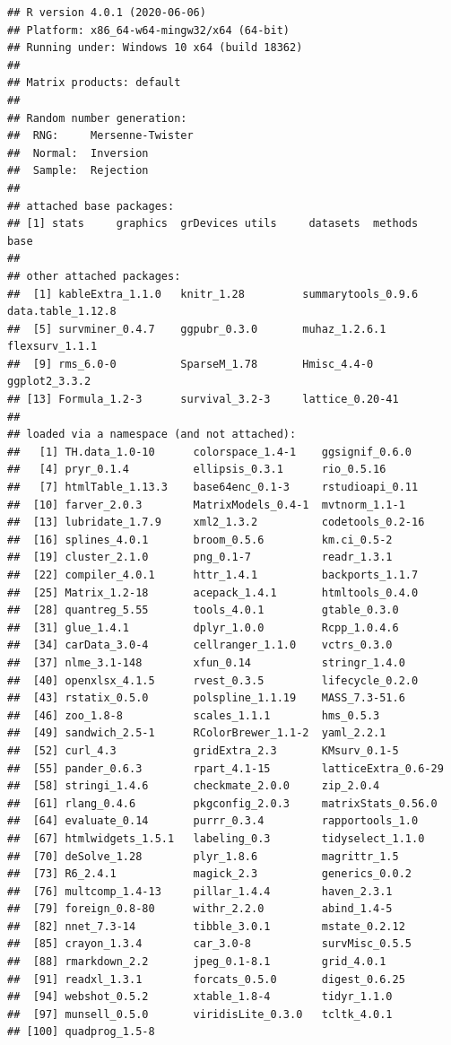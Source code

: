 \documentclass[]{article}
\begin{document}
\begin{verbatim}
## R version 4.0.1 (2020-06-06)
## Platform: x86_64-w64-mingw32/x64 (64-bit)
## Running under: Windows 10 x64 (build 18362)
## 
## Matrix products: default
## 
## Random number generation:
##  RNG:     Mersenne-Twister 
##  Normal:  Inversion 
##  Sample:  Rejection 
##  
## attached base packages:
## [1] stats     graphics  grDevices utils     datasets  methods   base     
## 
## other attached packages:
##  [1] kableExtra_1.1.0   knitr_1.28         summarytools_0.9.6 data.table_1.12.8 
##  [5] survminer_0.4.7    ggpubr_0.3.0       muhaz_1.2.6.1      flexsurv_1.1.1    
##  [9] rms_6.0-0          SparseM_1.78       Hmisc_4.4-0        ggplot2_3.3.2     
## [13] Formula_1.2-3      survival_3.2-3     lattice_0.20-41   
## 
## loaded via a namespace (and not attached):
##   [1] TH.data_1.0-10      colorspace_1.4-1    ggsignif_0.6.0     
##   [4] pryr_0.1.4          ellipsis_0.3.1      rio_0.5.16         
##   [7] htmlTable_1.13.3    base64enc_0.1-3     rstudioapi_0.11    
##  [10] farver_2.0.3        MatrixModels_0.4-1  mvtnorm_1.1-1      
##  [13] lubridate_1.7.9     xml2_1.3.2          codetools_0.2-16   
##  [16] splines_4.0.1       broom_0.5.6         km.ci_0.5-2        
##  [19] cluster_2.1.0       png_0.1-7           readr_1.3.1        
##  [22] compiler_4.0.1      httr_1.4.1          backports_1.1.7    
##  [25] Matrix_1.2-18       acepack_1.4.1       htmltools_0.4.0    
##  [28] quantreg_5.55       tools_4.0.1         gtable_0.3.0       
##  [31] glue_1.4.1          dplyr_1.0.0         Rcpp_1.0.4.6       
##  [34] carData_3.0-4       cellranger_1.1.0    vctrs_0.3.0        
##  [37] nlme_3.1-148        xfun_0.14           stringr_1.4.0      
##  [40] openxlsx_4.1.5      rvest_0.3.5         lifecycle_0.2.0    
##  [43] rstatix_0.5.0       polspline_1.1.19    MASS_7.3-51.6      
##  [46] zoo_1.8-8           scales_1.1.1        hms_0.5.3          
##  [49] sandwich_2.5-1      RColorBrewer_1.1-2  yaml_2.2.1         
##  [52] curl_4.3            gridExtra_2.3       KMsurv_0.1-5       
##  [55] pander_0.6.3        rpart_4.1-15        latticeExtra_0.6-29
##  [58] stringi_1.4.6       checkmate_2.0.0     zip_2.0.4          
##  [61] rlang_0.4.6         pkgconfig_2.0.3     matrixStats_0.56.0 
##  [64] evaluate_0.14       purrr_0.3.4         rapportools_1.0    
##  [67] htmlwidgets_1.5.1   labeling_0.3        tidyselect_1.1.0   
##  [70] deSolve_1.28        plyr_1.8.6          magrittr_1.5       
##  [73] R6_2.4.1            magick_2.3          generics_0.0.2     
##  [76] multcomp_1.4-13     pillar_1.4.4        haven_2.3.1        
##  [79] foreign_0.8-80      withr_2.2.0         abind_1.4-5        
##  [82] nnet_7.3-14         tibble_3.0.1        mstate_0.2.12      
##  [85] crayon_1.3.4        car_3.0-8           survMisc_0.5.5     
##  [88] rmarkdown_2.2       jpeg_0.1-8.1        grid_4.0.1         
##  [91] readxl_1.3.1        forcats_0.5.0       digest_0.6.25      
##  [94] webshot_0.5.2       xtable_1.8-4        tidyr_1.1.0        
##  [97] munsell_0.5.0       viridisLite_0.3.0   tcltk_4.0.1        
## [100] quadprog_1.5-8
\end{verbatim}
\end{document}
